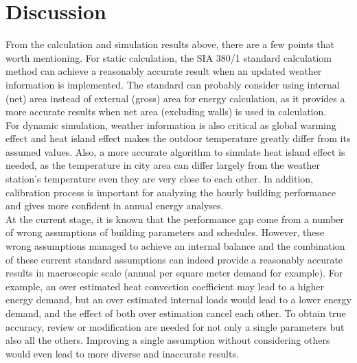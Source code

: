 \chapter{Discussion}
    From the calculation and simulation results above, there are a few points that worth mentioning. For static calculation, the SIA 380/1 standard calculatiom method can achieve a reasonably accurate result when an updated weather information is implemented. The standard can probably consider using internal (net) area instead of external (gross) area for energy calculation, as it provides a more accurate results when net area (excluding walls) is used in calculation.\\
    
    For dynamic simulation, weather information is also critical as global warming effect and heat island effect makes the outdoor temperature greatly differ from its assumed values. Also, a more accurate algorithm to simulate heat island effect is needed, as the temperature in city area can differ largely from the weather station's temperature even they are very close to each other. In addition, calibration process is important for analyzing the hourly building performance and gives more confident in annual energy analyses.\\
    
    At the current stage, it is known that the performance gap come from a number of wrong assumptions of building parameters and schedules. However, these wrong assumptions managed to achieve an internal balance and the combination of these current standard assumptions can indeed provide a reasonably accurate results in macroscopic scale (annual per square meter demand for example). For example, an over estimated heat convection coefficient may lead to a higher energy demand, but an over estimated internal loads would lead to a lower energy demand, and the effect of both over estimation cancel each other. To obtain true accuracy, review or modification are needed for not only a single parameters but also all the others. Improving a single assumption without considering others would even lead to more diverse and inaccurate results.\\
